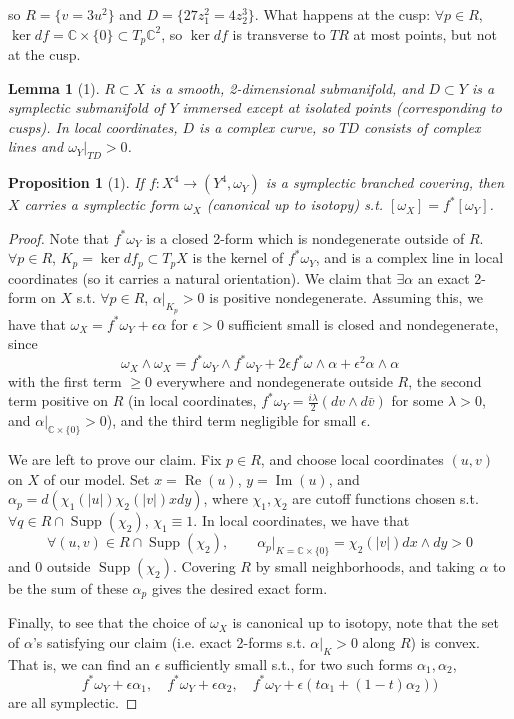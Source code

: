 \documentclass[UTF8,11pt]{ctexart}
\newtheorem*{lemma}{Lemma}
\newtheorem*{proposition}{Proposition}
\theoremstyle{definition}
\newcommand{\C}{\mathbb C}
\begin{document}
so $R=\{v=3u^2\}$ and $D=\{27z_1^2=4z_2^3\}$. What happens at the cusp: $\forall p\in R$, $\ker df=\C\times\{0\}\subset T_p\C^2$, so $\ker df$ is transverse to $TR$ at most points, but not at the cusp.
\begin{lemma}[1]
$R\subset X$ is a smooth, 2-dimensional submanifold, and $D\subset Y$ is a symplectic submanifold of $Y$ immersed except at isolated points (corresponding to cusps). In local coordinates, $D$ is a complex curve, so $TD$ consists of complex lines and $\omega_Y|_{TD}>0$.
\end{lemma}
\begin{proposition}[1]
If $f:X^4\to(Y^4,\omega_Y)$ is a symplectic branched covering, then $X$ carries a symplectic form $\omega_X$ (canonical up to isotopy) s.t. $[\omega_X]=f^*[\omega_Y]$.
\end{proposition}
\begin{proof}
Note that $f^*\omega_Y$ is a closed 2-form which is nondegenerate outside of $R$. $\forall p\in R$, $K_p=\ker df_p\subset T_pX$ is the kernel of $f^*\omega_Y$, and is a complex line in local coordinates (so it carries a natural orientation). We claim that $\exists\alpha$ an exact 2-form on $X$ s.t. $\forall p\in R$, $\alpha|_{K_p}>0$ is positive nondegenerate. Assuming this, we have that $\omega_X=f^*\omega_Y+\epsilon\alpha$ for $\epsilon>0$ sufficient small is closed and nondegenerate, since
\[
\omega_X\wedge\omega_X=f^*\omega_Y\wedge f^*\omega_Y+2\epsilon f^*\omega\wedge\alpha+\epsilon^2\alpha\wedge\alpha\tag{3}
\]
with the first term $\geq0$ everywhere and nondegenerate outside $R$, the second term positive on $R$ (in local coordinates, $f^*\omega_Y=\frac{i\lambda}{2}(dv\wedge d\bar v)$ for some $\lambda>0$, and $\alpha|_{\C\times\{0\}}>0$), and the third term negligible for small $\epsilon$.

We are left to prove our claim. Fix $p\in R$, and choose local coordinates $(u,v)$ on $X$ of our model. Set $x=\operatorname{Re}(u)$, $y=\operatorname{Im}(u)$, and $\alpha_p=d(\chi_1(|u|)\chi_2(|v|)xdy)$, where $\chi_1,\chi_2$ are cutoff functions chosen s.t. $\forall q\in R\cap\operatorname{Supp}(\chi_2)$, $\chi_1\equiv1$. In local coordinates, we have that
\[
\forall(u,v)\in R\cap\operatorname{Supp}(\chi_2),\qquad
\alpha_p|_{K=\C\times\{0\}}=\chi_2(|v|)dx\wedge dy>0\tag{4}
\]
and $0$ outside $\operatorname{Supp}(\chi_2)$. Covering $R$ by small neighborhoods, and taking $\alpha$ to be the sum of these $\alpha_p$ gives the desired exact form.

Finally, to see that the choice of $\omega_X$ is canonical up to isotopy, note that the set of $\alpha$'s satisfying our claim (i.e. exact 2-forms s.t. $\alpha|_K>0$ along $R$) is convex. That is, we can find an $\epsilon$ sufficiently small s.t., for two such forms $\alpha_1,\alpha_2$,
\[
f^*\omega_Y+\epsilon\alpha_1,\quad f^*\omega_Y+\epsilon\alpha_2,\quad
f^*\omega_Y+\epsilon(t\alpha_1+(1-t)\alpha_2))\tag{5}
\]
are all symplectic.
\end{proof}
\end{document}
